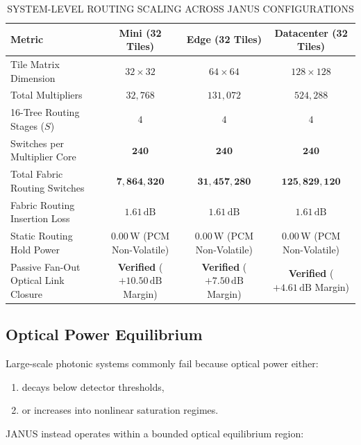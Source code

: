 \documentclass[journal]{IEEEtran}
\begin{document}
\begin{table}[htbp]
\centering
\small
\setlength{\tabcolsep}{6pt}
\renewcommand{\arraystretch}{1.15}
\caption{SYSTEM-LEVEL ROUTING SCALING ACROSS JANUS CONFIGURATIONS}
\label{tab:table13}
\begin{tabular*}{\textwidth}{@{\extracolsep{\fill}}lccc@{}}
\toprule
\textbf{Metric} & \textbf{Mini (32 Tiles)} & \textbf{Edge (32 Tiles)} & \textbf{Datacenter (32 Tiles)} \\
\midrule
Tile Matrix Dimension & $32 \times 32$ & $64 \times 64$ & $128 \times 128$ \\
Total Multipliers & $32{,}768$ & $131{,}072$ & $524{,}288$ \\
16-Tree Routing Stages ($S$) & $4$ & $4$ & $4$ \\
Switches per Multiplier Core & $\mathbf{240}$ & $\mathbf{240}$ & $\mathbf{240}$ \\
Total Fabric Routing Switches & $\mathbf{7{,}864{,}320}$ & $\mathbf{31{,}457{,}280}$ & $\mathbf{125{,}829{,}120}$ \\
Fabric Routing Insertion Loss & $\mathbf{1.61\,\mathrm{dB}}$ & $\mathbf{1.61\,\mathrm{dB}}$ & $\mathbf{1.61\,\mathrm{dB}}$ \\
Static Routing Hold Power & $\mathbf{0.00\,\mathrm{W}}$ (PCM Non-Volatile) & $\mathbf{0.00\,\mathrm{W}}$ (PCM Non-Volatile) & $\mathbf{0.00\,\mathrm{W}}$ (PCM Non-Volatile) \\
Passive Fan-Out Optical Link Closure & \textbf{Verified} ($+10.50\,\mathrm{dB}$ Margin) & \textbf{Verified} ($+7.50\,\mathrm{dB}$ Margin) & \textbf{Verified} ($+4.61\,\mathrm{dB}$ Margin) \\
\bottomrule
\end{tabular*}
\end{table}

\subsection{\textbf{Optical Power Equilibrium}}

Large-scale photonic systems commonly fail because optical power either:
\begin{enumerate}
\item decays below detector thresholds,
\item or increases into nonlinear saturation regimes.
\end{enumerate}
JANUS instead operates within a bounded optical equilibrium region:

\begin{center}
\end{center}
\end{document}
